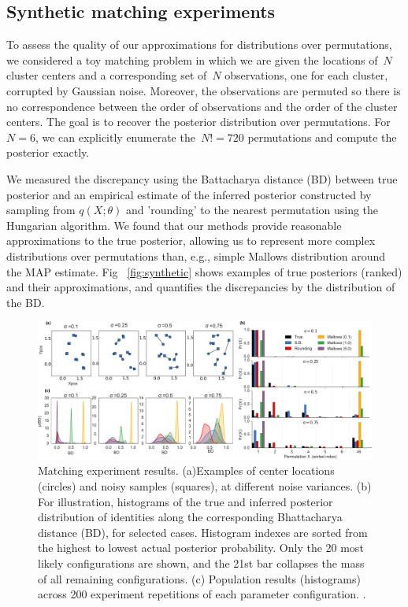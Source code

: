 \documentclass[twoside]{article}
\begin{document}
 \subsection{Synthetic matching experiments}
 To assess the quality of our approximations for distributions over
 permutations, we considered a toy matching problem in which we are given the locations of~$N$ cluster centers and a corresponding set of~$N$
 observations, one for each cluster, corrupted by Gaussian noise.
 Moreover, the observations are permuted so there is no correspondence
 between the order of observations and the order of the cluster centers.
 The goal is to recover the posterior distribution over permutations.
 For~$N=6$, we can explicitly enumerate the~$N!=720$ permutations and
 compute the posterior exactly. 

 We measured the discrepancy using the Battacharya distance (BD)
 between true posterior and an empirical estimate of the inferred
 posterior constructed by sampling from $q(X; \theta)$ and 'rounding'
 to the nearest permutation using the Hungarian algorithm. We found
 that our methods provide reasonable approximations to the true
 posterior, allowing us to represent more complex distributions over
 permutations than, e.g., simple Mallows distribution around the MAP
 estimate. Fig ~\ref{fig:synthetic} shows
 examples of true posteriors (ranked) and their approximations, and
 quantifies the discrepancies by the distribution of the BD.

 \begin{figure}[t] 
   \centering
   \includegraphics[width=1.0\textwidth]{../figures/figure8.pdf}
   \caption{Matching experiment results. (a)Examples of center locations (circles) and noisy samples (squares), at different noise variances. (b) For illustration, histograms of the true and inferred posterior distribution of identities along the corresponding Bhattacharya distance (BD), for selected cases. Histogram indexes are sorted from the highest to lowest actual posterior probability. Only the 20 most likely configurations are shown, and the 21st bar collapses the mass of all remaining configurations. (c) Population results (histograms) across 200 experiment repetitions of each parameter configuration. .}
   \label{fig:VAE}
\end{figure}
\label{sec:vae}
\end{document}
